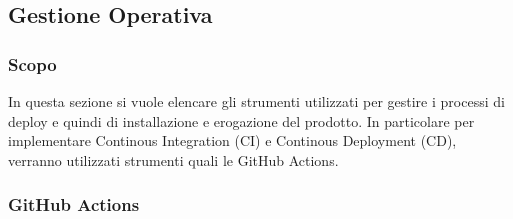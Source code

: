 \subsection{Gestione Operativa}
\subsubsection{Scopo}
In questa sezione si vuole elencare gli strumenti utilizzati per gestire i processi di deploy e quindi di installazione e erogazione del prodotto. In particolare per implementare Continous Integration (CI) e Continous Deployment (CD), verranno utilizzati strumenti quali le GitHub Actions.
\subsubsection{GitHub Actions}
